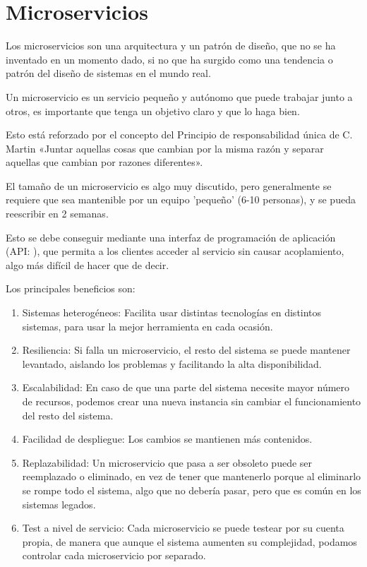 \section{Microservicios}

Los microservicios son una arquitectura y un patrón de diseño, que no se ha inventado en un momento dado, si no que ha surgido como una tendencia o patrón del diseño de sistemas en el mundo real. 

Un microservicio es un servicio pequeño y autónomo que puede trabajar junto a otros, es importante que tenga un objetivo claro y que lo haga bien.

Esto está reforzado por el concepto del Principio de responsabilidad única de C. Martin\cite{martin03} «Juntar aquellas cosas que cambian por la misma razón y separar aquellas que cambian por razones diferentes».

El tamaño de un microservicio es algo muy discutido, pero generalmente se requiere que sea mantenible por un equipo 'pequeño' (6-10 personas), y se pueda reescribir en 2 semanas.

Esto se debe conseguir mediante una interfaz de programación de aplicación (API: ), que permita a los clientes acceder al servicio sin causar acoplamiento, algo más difícil de hacer que de decir.

Los principales beneficios son:
\begin{enumerate}
\item Sistemas heterogéneos: Facilita usar distintas tecnologías en distintos sistemas, para usar la mejor herramienta en cada ocasión.
\item Resiliencia: Si falla un microservicio, el resto del sistema se puede mantener levantado, aislando los problemas y facilitando la alta disponibilidad.
\item Escalabilidad: En caso de que una parte del sistema necesite mayor número de recursos, podemos crear una nueva instancia sin cambiar el funcionamiento del resto del sistema.
\item Facilidad de despliegue: Los cambios se mantienen más contenidos.
\item Replazabilidad: Un microservicio que pasa a ser obsoleto puede ser reemplazado o eliminado, en vez de tener que mantenerlo porque al eliminarlo se rompe todo el sistema, algo que no debería pasar, pero que es común en los sistemas legados.
\item Test a nivel de servicio: Cada microservicio se puede testear por su cuenta propia, de manera que aunque el sistema aumenten su complejidad, podamos controlar cada microservicio por separado.
\end{enumerate}

